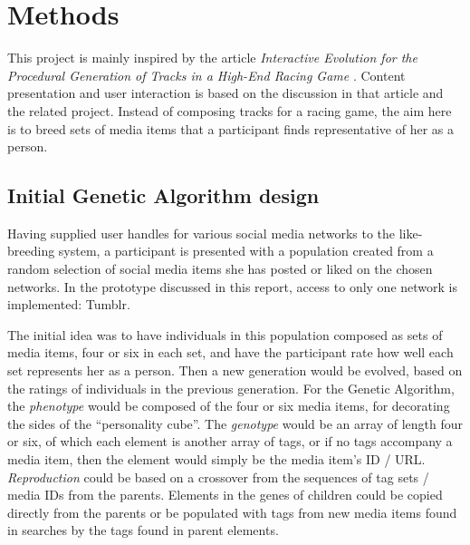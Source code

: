 \documentclass[]{article}
\begin{document}
\section{Methods}
\label{sec:Methods}

This project is mainly inspired by the article \textit{Interactive Evolution for the Procedural Generation of Tracks in a High-End Racing Game} \cite{cardamone2011interactive}.  Content presentation and user interaction is based on the discussion in that article and the related project.  Instead of composing tracks for a racing game, the aim here is to breed sets of media items that a participant finds representative of her as a person.


\subsection{Initial Genetic Algorithm design}

Having supplied user handles for various social media networks to the like-breeding system, a participant is presented with a population created from a random selection of social media items she has posted or liked on the chosen networks.  In the prototype discussed in this report, access to only one network is implemented:  Tumblr.

The initial idea was to have individuals in this population composed as sets of media items, four or six in each set, and have the participant rate how well each set represents her as a person.  Then a new generation would be evolved, based on the ratings of individuals in the previous generation.  For the Genetic Algorithm, the \textit{phenotype} would be composed of the four or six media items, for decorating the sides of the “personality cube”.  
The \textit{genotype} would be an array of length four or six, of which each element is another array of tags, or if no tags accompany a media item, then the element would simply be the media item's ID / URL.
\textit{Reproduction} could be based on a crossover from the sequences of tag sets / media IDs from the parents.  
Elements in the genes of children could be copied directly from the parents or be populated with tags from new media items found in searches by the tags found in parent elements.
\end{document}
